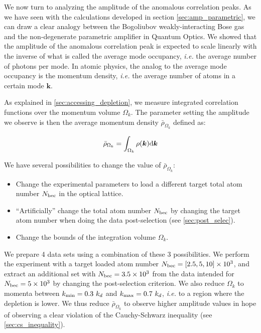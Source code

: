 \label{sec:amp_anomalous}

We now turn to analyzing the amplitude of the anomalous correlation peaks. As we have seen with the calculations developed in section \ref{sec:amp_parametric}, we can draw a clear analogy between the Bogoliubov weakly-interacting Bose gas and the non-degenerate parametric amplifier in Quantum Optics. We showed that the amplitude of the anomalous correlation peak is expected to scale linearly with the inverse of what is called the average mode occupancy, {\it i.e.} the average number of photons per mode. In atomic physics, the analog to the average mode occupancy is the momentum density, {\it i.e.} the average number of atoms in a certain mode $\bm{k}$.

As explained in \ref{sec:accessing_depletion}, we measure integrated correlation functions over the momentum volume $\Omega_k$. The parameter setting the amplitude we observe is then the average momentum density $\bar{\rho}_{\Omega_k}$ defined as:

\begin{equation}
    \bar{\rho}_{\Omega_k}=\int_{\Omega_{k}} \rho({\bm k}) {\rm d}{\bm k}
\end{equation}

We have several possibilities to change the value of $\bar{\rho}_{\Omega_k}$:

\begin{itemize}
    \item Change the experimental parameters to load a different target total atom number $N_{\rm{bec}}$ in the optical lattice.
    \item ``Artificially'' change the total atom number $N_{\rm{bec}}$ by changing the target atom number when doing the data post-selection (see \ref{sec:post_selec}).
    \item Change the bounds of the integration volume $\Omega_k$.
\end{itemize}

We prepare 4 data sets using a combination of these 3 possibilities. We perform the experiment with a target loaded atom number $N_{\rm{bec}}=[2.5,5,10] \times 10^3$, and extract an additional set with $N_{\rm{bec}}=3.5 \times 10^3$ from the data intended for $N_{\rm{bec}} = 5 \times 10^3$ by changing the post-selection criterion. We also reduce $\Omega_k$ to momenta between $k_{\rm{min}} = 0.3 \ k_d$ and $k_{\rm{max}} = 0.7 \ k_d$, {\it i.e.} to a region where the depletion is lower. We thus reduce $\bar{\rho}_{\Omega_k}$ to observe higher amplitude values in hope of observing a clear violation of the Cauchy-Schwarz inequality (see \ref{sec:cs_inequality}).

